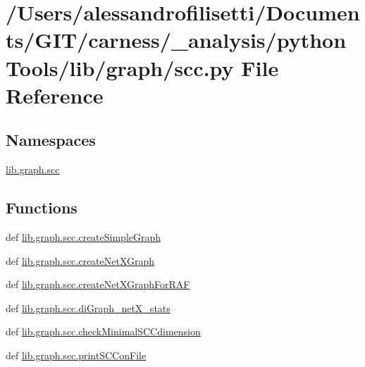 \hypertarget{a00092}{\section{/\+Users/alessandrofilisetti/\+Documents/\+G\+I\+T/carness/\+\_\+analysis/python\+Tools/lib/graph/scc.py File Reference}
\label{a00092}
}
\subsection*{Namespaces}
\begin{DoxyCompactItemize}
\item 
 \hyperlink{a00144}{lib.\+graph.\+scc}
\end{DoxyCompactItemize}
\subsection*{Functions}
\begin{DoxyCompactItemize}
\item 
def \hyperlink{a00144_a7d0d5fec525d92ca329b1b58da0712be}{lib.\+graph.\+scc.\+create\+Simple\+Graph}
\item 
def \hyperlink{a00144_abc47bb4f5ff50cf5d1dd81c007c1e332}{lib.\+graph.\+scc.\+create\+Net\+X\+Graph}
\item 
def \hyperlink{a00144_aff58b86401d5f04b13100aae79560fe7}{lib.\+graph.\+scc.\+create\+Net\+X\+Graph\+For\+R\+A\+F}
\item 
def \hyperlink{a00144_a98b4189c8603e40d7879d606ed4b215a}{lib.\+graph.\+scc.\+di\+Graph\+\_\+net\+X\+\_\+stats}
\item 
def \hyperlink{a00144_a54bdd154f11152272776a28a4abfcf06}{lib.\+graph.\+scc.\+check\+Minimal\+S\+C\+Cdimension}
\item 
def \hyperlink{a00144_a3dbfb9a21bab7b43f8c634a220af08fc}{lib.\+graph.\+scc.\+print\+S\+C\+Con\+File}
\end{DoxyCompactItemize}
